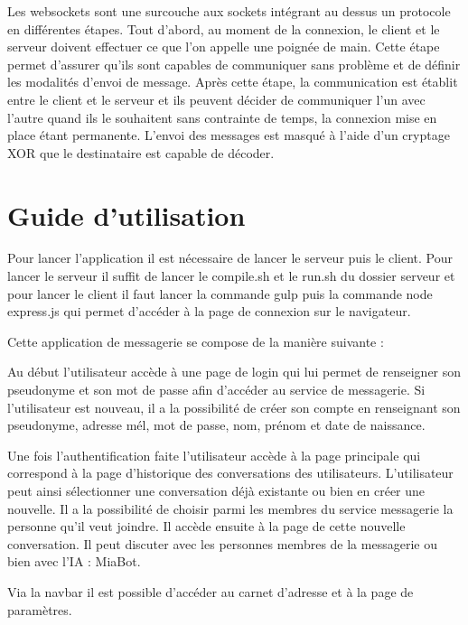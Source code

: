 \par Les websockets sont une surcouche aux sockets intégrant au dessus un protocole en différentes étapes.
Tout d'abord, au moment de la connexion, le client et le serveur doivent effectuer ce que l'on appelle une poignée de main.
Cette étape permet d'assurer qu'ils sont capables de communiquer sans problème et de définir les modalités d'envoi de message.
Après cette étape, la communication est établit entre le client et le serveur et ils peuvent décider de communiquer l'un avec l'autre 
quand ils le souhaitent sans contrainte de temps, la connexion mise en place étant permanente. 
L'envoi des messages est masqué à l'aide d'un cryptage XOR que le destinataire est capable de décoder.

\section{Guide d'utilisation}

\par Pour lancer l'application il est nécessaire de lancer le serveur puis le client. Pour lancer le serveur il suffit de lancer le compile.sh et le run.sh du dossier serveur et pour lancer le client il faut lancer la commande gulp puis la commande node express.js qui permet d'accéder à la page de connexion sur le navigateur. \\


\par Cette application de messagerie se compose de la manière suivante : \\

\par Au début l'utilisateur accède à une page de login qui lui permet de renseigner son pseudonyme et son mot de passe afin d'accéder au service de messagerie. Si l'utilisateur est nouveau, il a la possibilité de créer son compte en renseignant son pseudonyme, adresse mél, mot de passe, nom, prénom et date de naissance. 
\par Une fois l'authentification faite l'utilisateur accède à la page principale qui correspond à la page d'historique des conversations des utilisateurs. L'utilisateur peut ainsi sélectionner une conversation déjà existante ou bien en créer une nouvelle. Il a la possibilité de choisir parmi les membres du service messagerie la personne qu'il veut joindre. Il accède ensuite à la page de cette nouvelle conversation. Il peut discuter avec les personnes membres de la messagerie ou bien avec l'IA : MiaBot.
\par Via la navbar il est possible d'accéder au carnet d'adresse et à la page de paramètres. \\


